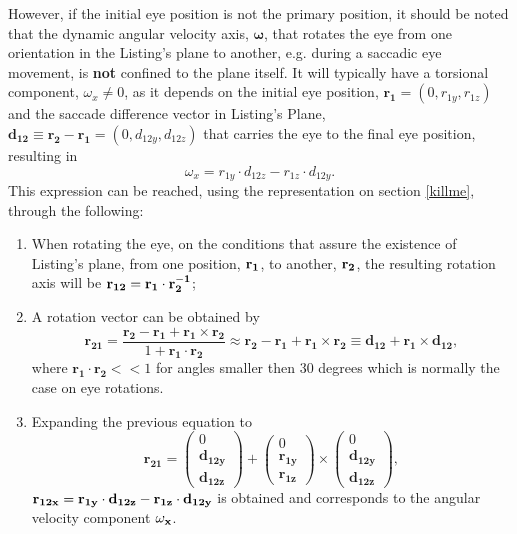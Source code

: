 However, if the initial eye position is not the primary position, it should be noted that the dynamic angular velocity axis, $ \mathbf{\omega}$, that rotates the eye from one orientation in the Listing's plane to another, e.g. during a saccadic eye movement, is {\bf not} confined to the plane itself. It will typically have a torsional component, $\omega_x \neq 0$, as it depends on the initial eye position, $ \mathbf{r_1}  = (0, r_{1y}, r_{1z})$ and the saccade difference vector in Listing's Plane, $\mathbf{d_{12} }\equiv \mathbf{r_2} - \mathbf{r_1} = (0, d_{12y},d_{12z})$ that carries the eye to the final eye position, resulting in
\begin{equation}
\omega _x = r_{1y} \cdot d_{12z} - r_{1z} \cdot d_{12y}.
\end{equation} 
This expression can be reached, using the representation on section \ref{killme}, through the following:
\begin{enumerate}
	\item When rotating the eye, on the conditions that assure the existence of Listing's plane, from one position, $\bf r_1$, to another, $\bf r_2$, the resulting rotation axis will be $\bf r_{12} = r_1  \cdot r_2^{-1}$;
	\item A rotation vector can be obtained by
	\begin{equation}
	\mathbf{r _ { 21 } } = \frac { \mathbf{r _ { 2 }} - \mathbf{r _ { 1 } }+ \mathbf{r _ { 1 }} \times \mathbf{r _ { 2 } }} { 1 + \mathbf{r _ { 1 }} \cdot \mathbf{r _ { 2 } }} \approx \mathbf{r _ { 2 }} - \mathbf{r _ { 1 }} + \mathbf{r _ { 1 }} \times \mathbf{r _ { 2 }} \equiv \mathbf{d _ { 12 }} + \mathbf{r _ { 1 } }\times \mathbf{d_{12 }} ,
	\end{equation}
	where $\mathbf{r _ { 1 }} \cdot \mathbf{r _ { 2 }} << 1$ for angles smaller then 30 degrees which is normally the case on eye rotations.
	\item Expanding the previous equation to
	\begin{equation}
	\mathbf{r _ { 21 }} = 
	\left( \begin{array} { c } { 0 } \\ \mathbf{{ d_{12y}}} \\ \mathbf{{d_{12z}}}\end{array}\right) +  \left( \begin{array} { c } { 0 } \\ \mathbf{{ r _ { 1 y } }} \\ \mathbf{{ r _ { 1 z }  }}\end{array}\right) 
	\times \left( \begin{array} { c } { 0 } \\ \mathbf{{ d_{12y}}} \\ \mathbf{{ d_{12z} }}  \end{array} \right),
	\end{equation}
	$\bf r_{12x} = r_{1y} \cdot d_{12z} - r_{1z} \cdot d_{12y}$ is obtained and corresponds to the angular velocity component $\bf \omega_x$.
\end{enumerate}
\cite{donders} 


